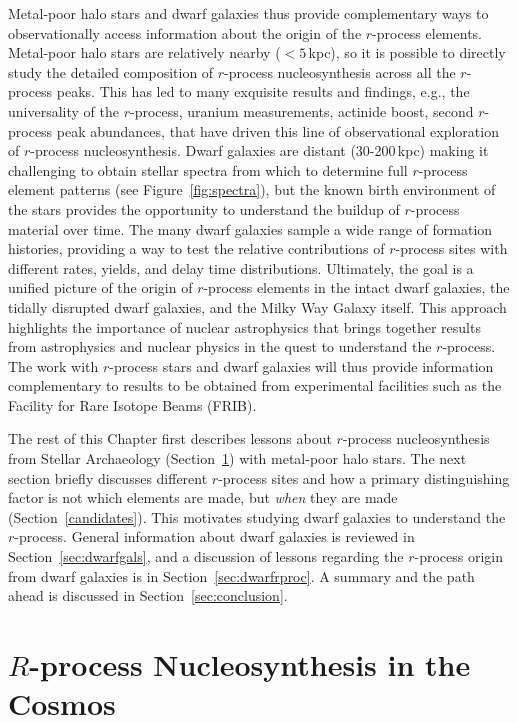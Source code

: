 \documentclass[letterpaper]{article}
\begin{document}
Metal-poor halo stars and dwarf galaxies thus provide complementary ways to observationally access information about the origin of the $r$-process elements.
Metal-poor halo stars are relatively nearby ($<5$\,kpc), so it is possible to directly study the detailed composition of $r$-process nucleosynthesis across all the $r$-process peaks. This has led to many exquisite results and findings, e.g., the universality of the $r$-process, uranium measurements, actinide boost, second $r$-process peak abundances, that have driven this line of observational exploration of $r$-process nucleosynthesis. 
% 
Dwarf galaxies are distant (30-200\,kpc) making it challenging to obtain stellar spectra from which to determine full $r$-process element patterns (see Figure~\ref{fig:spectra}), but the known birth environment of the stars provides the opportunity to understand the buildup of $r$-process material over time. The many dwarf galaxies sample a wide range of formation histories, providing a way to test the relative contributions of $r$-process sites with different rates, yields, and delay time distributions.
Ultimately, the goal is a unified picture of the origin of $r$-process elements in the intact dwarf galaxies, the tidally disrupted dwarf galaxies, and the Milky Way Galaxy itself. This approach highlights the importance of nuclear astrophysics that brings together results from astrophysics and nuclear physics in the quest to understand the $r$-process. The work with $r$-process stars and dwarf galaxies will thus provide information complementary to results to be obtained from experimental facilities such as the Facility for Rare Isotope Beams (FRIB).

The rest of this Chapter first describes lessons about $r$-process nucleosynthesis from Stellar Archaeology (Section~\ref{sec:halo}) with metal-poor halo stars. The next section briefly discusses different $r$-process sites and how a primary distinguishing factor is not which elements are made, but \textit{when} they are made (Section~\ref{candidates}). This motivates studying dwarf galaxies to understand the $r$-process. General information about dwarf galaxies is reviewed in Section~\ref{sec:dwarfgals}, and a discussion of lessons regarding the $r$-process origin from dwarf galaxies is in Section~\ref{sec:dwarfrproc}. A summary and the path ahead is discussed in Section~\ref{sec:conclusion}.

\section{$R$-process Nucleosynthesis in the Cosmos}\label{sec:halo}
\end{document}
